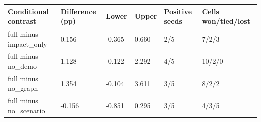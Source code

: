 \begin{tabular}{llllll}
\toprule
Conditional contrast & Difference (pp) & Lower & Upper & Positive seeds & Cells won/tied/lost\\
\midrule
full minus impact\_only & 0.156 & -0.365 & 0.660 & 2/5 & 7/2/3\\
full minus no\_demo & 1.128 & -0.122 & 2.292 & 4/5 & 10/2/0\\
full minus no\_graph & 1.354 & -0.104 & 3.611 & 3/5 & 8/2/2\\
full minus no\_scenario & -0.156 & -0.851 & 0.295 & 3/5 & 4/3/5\\
\bottomrule
\end{tabular}